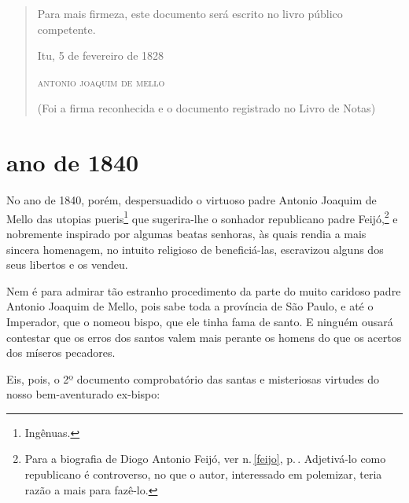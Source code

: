 \begin{quote}
Para mais firmeza, este documento será escrito no livro público
competente.

\begin{flushright}
Itu, 5 de fevereiro de 1828

\textsc{antonio joaquim de mello}

(Foi a firma reconhecida e o documento registrado no Livro de Notas)
\end{flushright}
\end{quote}

\section{ano de 1840}

No ano de 1840, porém, despersuadido o virtuoso padre Antonio Joaquim de
Mello das utopias pueris\footnote{Ingênuas.} que sugerira-lhe o
sonhador republicano padre Feijó,\footnote{Para a biografia de Diogo Antonio Feijó,
  ver n.\,\ref{feijo}, p.\,\pageref{feijo}. Adjetivá-lo
  como republicano é controverso, no que o autor, interessado em
  polemizar, teria razão a mais para fazê-lo.} e nobremente inspirado
por algumas beatas senhoras, às quais rendia a mais sincera homenagem,
no intuito religioso de beneficiá-las, escravizou alguns dos seus
libertos e os vendeu.

Nem é para admirar tão estranho procedimento da parte do muito caridoso
padre Antonio Joaquim de Mello, pois sabe toda a província de São Paulo,
e até o Imperador, que o nomeou bispo, que ele tinha fama de santo. E
ninguém ousará contestar que os erros dos santos valem mais perante os
homens do que os acertos dos míseros pecadores.

Eis, pois, o 2º documento comprobatório das santas e misteriosas
virtudes do nosso bem-aventurado ex-bispo:

